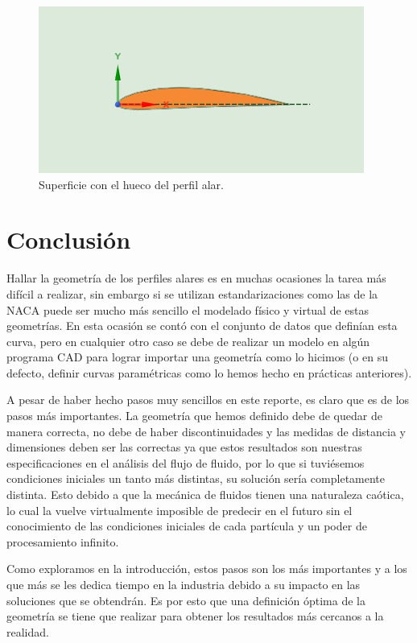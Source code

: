\documentclass[12pt, letterpaper]{article}
\begin{document}
\begin{figure}[H]
	\centering
	\includegraphics[width=\textwidth]{19.png}
	\caption{Superficie con el hueco del perfil alar.}
\end{figure}

\section*{Conclusión}

Hallar la geometría de los perfiles alares es en muchas ocasiones la tarea más difícil a realizar, sin embargo si se utilizan estandarizaciones como las de la NACA puede ser mucho más sencillo el modelado físico y virtual de estas geometrías. En esta ocasión se contó con el conjunto de datos que definían esta curva, pero en cualquier otro caso se debe de realizar un modelo en algún programa CAD para lograr importar una geometría como lo hicimos (o en su defecto, definir curvas paramétricas como lo hemos hecho en prácticas anteriores).

A pesar de haber hecho pasos muy sencillos en este reporte, es claro que es de los pasos más importantes. La geometría que hemos definido debe de quedar de manera correcta, no debe de haber discontinuidades y las medidas de distancia y dimensiones deben ser las correctas ya que estos resultados son nuestras especificaciones en el análisis del flujo de fluido, por lo que si tuviésemos condiciones iniciales un tanto más distintas, su solución sería completamente distinta. Esto debido a que la mecánica de fluidos tienen una naturaleza caótica, lo cual la vuelve virtualmente imposible de predecir en el futuro sin el conocimiento de las condiciones iniciales de cada partícula y un poder de procesamiento infinito.

Como exploramos en la introducción, estos pasos son los más importantes y a los que más se les dedica tiempo en la industria debido a su impacto en las soluciones que se obtendrán. Es por esto que una definición óptima de la geometría se tiene que realizar para obtener los resultados más cercanos a la realidad.

\renewcommand\refname{References}
\printbibliography
\end{document}
